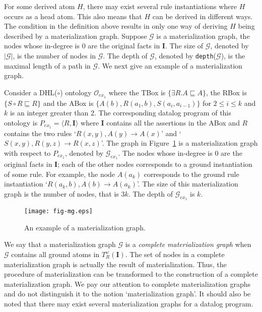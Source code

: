 \documentclass[final,1p,times]{elsarticle}
\begin{document}
For some derived atom $H$, there may exist several rule instantiations where $H$
occurs as a head atom.
This also means that $H$ can be derived in different ways.
The condition in the definition above results in only one way of deriving $H$ being
described by a materialization graph.
Suppose $\mathcal{G}$ is a materialization graph, the nodes whose in-degree is 0 are the
original facts in $\textbf{I}$.
The size of $\mathcal{G}$, denoted by $|\mathcal{G}|$, is the number of nodes in $\mathcal{G}$.
The depth of $\mathcal{G}$, denoted by \texttt{depth}($\mathcal{G}$), is the maximal length of a path
in $\mathcal{G}$.
We next give an example of a materialization graph.\\

\begin{example}\label{exp:mg}
Consider a DHL($\circ$) ontology $\mathcal{O}_{ex_1}$ where the TBox is
$\{\exists R.A\sqsubseteq A\}$, the RBox is $\{S\circ R\sqsubseteq R\}$ and
the ABox is $\{A(b),R(a_1,b),S(a_i,a_{i-1})\}$ for $2\leq i\leq k$ and
$k$ is an integer greater than $2$.
The corresponding datalog program of this ontology is $P_{ex_1}=\langle R, \textbf{I}\rangle$
where $\textbf{I}$ contains all the assertions in the ABox
and $R$ contains the two rules `$R(x,y),A(y)\rightarrow A(x)$'
and `$S(x,y),R(y,z)\rightarrow R(x,z)$'.
The graph in Figure~\ref{fig:mg} is a materialization graph with respect to $P_{ex_1}$,
denoted by $\mathcal{G}_{ex_1}$.
The nodes whose in-degree is 0 are the original facts in $\textbf{I}$;
each of the other nodes corresponds to a ground instantiation of some rule.
For example, the node $A(a_k)$ corresponds to the ground rule instantiation
`$R(a_k,b),A(b)\rightarrow A(a_k)$'.
The size of this materialization graph is the number of nodes, that is $3k$.
The depth of $\mathcal{G}_{ex_1}$ is $k$.
\end{example}

\begin{figure}[htbp]
\begin{center}
\texttt{[image: fig-mg.eps]}
\caption{An example of a materialization graph.}
\label{fig:mg}
\end{center}
\end{figure}

We say that a materialization graph $\mathcal{G}$ is a \emph{complete materialization graph}
when $\mathcal{G}$ contains all ground atoms in $T_R^{\omega}(\textbf{I})$.
The set of nodes in a complete materialization graph is actually the result
of materialization.
Thus, the procedure of materialization can be transformed to the construction of
a complete materialization graph.
We pay our attention to complete materialization graphs and do not distinguish it to the
notion `materialization graph'.
It should also be noted that there may exist several materialization graphs for a datalog program.
\end{document}
